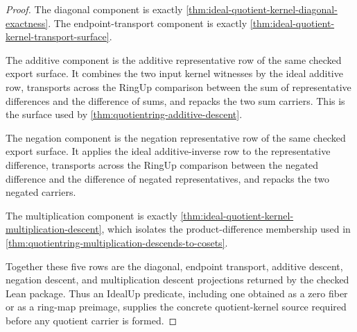 \begin{proof}
The diagonal component is exactly \autoref{thm:ideal-quotient-kernel-diagonal-exactness}. The endpoint-transport component is exactly \autoref{thm:ideal-quotient-kernel-transport-surface}.

The additive component is the additive representative row of the same checked export surface. It combines the two input kernel witnesses by the ideal additive row, transports across the RingUp comparison between the sum of representative differences and the difference of sums, and repacks the two sum carriers. This is the surface used by \autoref{thm:quotientring-additive-descent}.

The negation component is the negation representative row of the same checked export surface. It applies the ideal additive-inverse row to the representative difference, transports across the RingUp comparison between the negated difference and the difference of negated representatives, and repacks the two negated carriers.

The multiplication component is exactly \autoref{thm:ideal-quotient-kernel-multiplication-descent}, which isolates the product-difference membership used in \autoref{thm:quotientring-multiplication-descends-to-cosets}.

Together these five rows are the diagonal, endpoint transport, additive descent, negation descent, and multiplication descent projections returned by the checked Lean package. Thus an IdealUp predicate, including one obtained as a zero fiber or as a ring-map preimage, supplies the concrete quotient-kernel source required before any quotient carrier is formed.
\end{proof}

